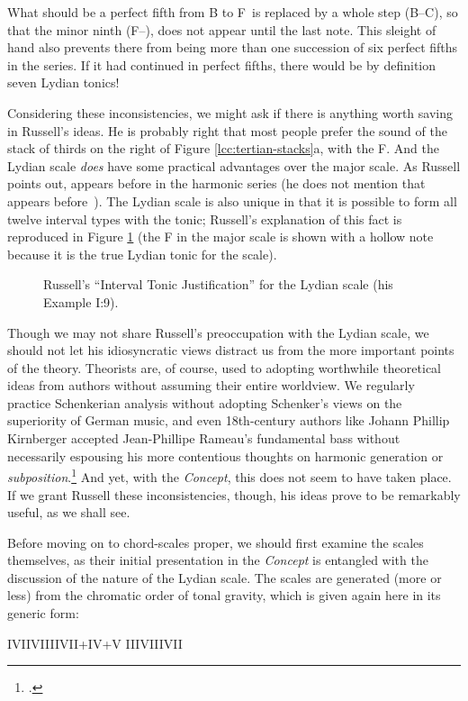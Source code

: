 \noindent What should be a perfect fifth from B to F\sharp\ is replaced by a
whole step (B--C\sharp), so that the minor ninth (F--\Gflat), does not appear
until the last note. This sleight of hand also prevents there from being more
than one succession of six perfect fifths in the series. If it had continued
in perfect fifths, there would be by definition seven Lydian tonics!

Considering these inconsistencies, we might ask if there is anything worth
saving in Russell's ideas. He is probably right that most people prefer the
sound of the stack of thirds on the right of Figure \ref{lcc:tertian-stacks}a,
with the F\sharp. And the Lydian scale \emph{does} have some
practical advantages over the major scale. As Russell points out, \sharp{}
appears before \nat{} in the harmonic series (he does not mention that
\flat{} appears before \nat{}\,). The Lydian scale is also unique in that
it is possible to form all twelve interval types with the tonic; Russell's
explanation of this fact is reproduced in Figure \ref{lcc:lydian-intervals}
(the F in the major scale is shown with a hollow note because it is the true
Lydian tonic for the scale).

\begin{figure}[tbp]
  \caption[Russell's ``Interval Tonic Justification'' for the Lydian
  scale.]{Russell's ``Interval Tonic Justification'' for the Lydian scale
    (his Example I:9).}
  \label{lcc:lydian-intervals}
\end{figure}

Though we may not share Russell's preoccupation with the Lydian scale, we
should not let his idiosyncratic views distract us from the more important
points of the theory. Theorists are, of course, used to adopting worthwhile
theoretical ideas from authors without assuming their entire worldview. We
regularly practice Schenkerian analysis without adopting Schenker's views on
the superiority of German music, and even 18th-century authors like Johann
Phillip Kirnberger accepted Jean-Phillipe Rameau's fundamental bass without
necessarily espousing his more contentious thoughts on harmonic generation or
\emph{subposition}.\footcite[240--41]{lester:1992} And yet, with the
\emph{Concept}, this does not seem to have taken place. If we grant
Russell these inconsistencies, though, his ideas prove to be remarkably
useful, as we shall see.

Before moving on to chord-scales proper, we should first examine the scales
themselves, as their initial presentation in the \emph{Concept} is entangled
with the discussion of the nature of the Lydian scale. The scales are
generated (more or less) from the chromatic order of tonal gravity, which is
given again here in its generic form: \\
{\centering I\quad V\quad II\quad VI\quad III\quad VII\quad +IV\quad +V\quad
  \flat{}III\quad \flat{}VII\quad IV\quad \flat{}II\quad \par}

